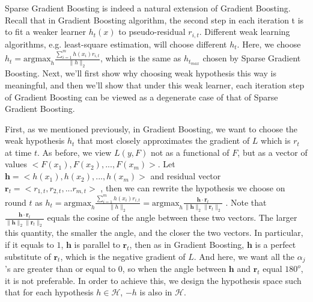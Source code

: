 \documentclass{article} %
\begin{document}
Sparse Gradient Boosting is indeed a natural extension of Gradient Boosting.  Recall that in Gradient Boosting algorithm, the  second step in each iteration t is to fit a weaker learner $h_t(x)$ to pseudo-residual $r_{i,t}$.  Different weak learning algorithms, e.g. least-square estimation, will choose different $h_t$. Here, we choose $h_t=\mbox{argmax}_{h}   \frac{\sum_{i=1}^{m}h(x_{i})r_{i,t} }  {\| h \|_2} $, which is the same as $h_{t_{max}}$ chosen by Sparse Gradient Boosting.  Next, we'll first show why choosing weak hypothesis this way is meaningful, and then we'll show that under this weak learner, each iteration step of Gradient Boosting can be viewed as a degenerate case of that of Sparse Gradient Boosting.

First, as we mentioned previously, in Gradient Boosting, we want to choose the weak hypothesis $h_t$ that most closely approximates the gradient of $L$ which is $r_t$ at time $t$.  As before, we view $L(y,F)$ not as a functional of $F$, but as a vector of values $<F(x_1),F(x_2),...,F(x_m)>$.  Let  $\boldsymbol  h=<h(x_1), h(x_2),...,h(x_m)>$ and  residual vector $\boldsymbol r_{t}=<r_{1,t},r_{2,t},...r_{m,t}>$ , then we can rewrite the hypothesis we choose on round $t$ as $h_t=\mbox{argmax}_{h}   \frac{\sum_{i=1}^{m}h(x_{i})r_{i,t} }  {\| h \|_2} =\mbox{argmax}_{h}   \frac{\boldsymbol h \cdot \boldsymbol r_t} {\| \boldsymbol h \|_2 \|\boldsymbol r_{t}\|_2}  $ . Note that $  \frac{\boldsymbol h \cdot \boldsymbol r_t} {\| \boldsymbol h \|_2 \|\boldsymbol r_{t}\|_2}  $ equals the cosine of the angle between these two vectors. The larger this quantity, the smaller the angle, and the closer the two vectors. In particular, if it equals to $1$, $\boldsymbol h$ is parallel to $\boldsymbol r_t$, then as in Gradient Boosting, $\boldsymbol h$ is a perfect  substitute of $\boldsymbol r_t$, which is the negative gradient of $L$. And here, we want all the $\alpha_j$'s are greater than or equal to $0$, so when the angle between $\boldsymbol h$ and $\boldsymbol r_t$ equal $180^o$, it is not preferable. In order to achieve this, we design the hypothesis space such that for each hypothesis $h\in \mathcal{H}$, $-h$ is also in $\mathcal{H}$.
\end{document}
